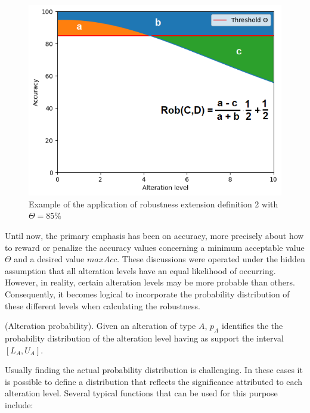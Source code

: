 \begin{figure}[h]
	\centering
	\includegraphics[width=0.7\linewidth]{ImageFiles/ANNRob/rob_lin_tol_lin_pen}
	\caption{Example of the application of robustness extension definition 2 with $\Theta=85\%$}
	\label{fig:rob_lin_tol_lin_pen}
\end{figure}

Until now, the primary emphasis has been on accuracy, more precisely about how to reward or penalize the accuracy values concerning a minimum acceptable value $\Theta$ and a desired value $maxAcc$. These discussions were operated under the hidden assumption that all alteration levels have an equal likelihood of occurring. However, in reality, certain alteration levels may be more probable than others. Consequently, it becomes logical to incorporate the probability distribution of these different levels when calculating the robustness.

\begin{definition}(Alteration probability).
	Given an alteration of type $A$, $p_A$ identifies the the probability distribution of the alteration level having
	as support the interval $[L_A, U_A]$. 
\end{definition}

Usually finding the actual probability distribution is challenging. In these cases it is possible to define a distribution that reflects the significance attributed to each alteration level. Several typical functions that can be used for this purpose include:

